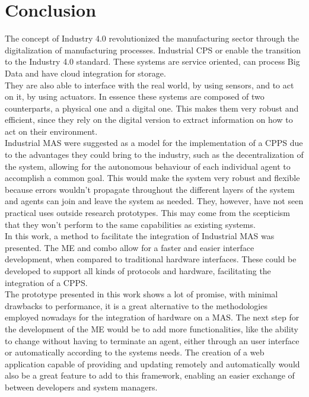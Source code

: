 


\glsresetall

\chapter{Conclusion}
\label{cha:conclusion}

The concept of Industry 4.0 revolutionized the manufacturing sector through the digitalization of manufacturing processes. Industrial \acrlong{CPS} or  enable the transition to the Industry 4.0 standard. These systems are service oriented, can process Big Data and have cloud integration for storage.\\

They are also able to interface with the real world, by using sensors, and to act on it, by using actuators. In essence these systems are composed of two counterparts, a physical one and a digital one. This makes them very robust and efficient, since they rely on the digital version to extract information on how to act on their environment.\\

Industrial \acrlong{MAS} were suggested as a model for the implementation of a \acrlong{CPPS} due to the advantages they could bring to the industry, such as the decentralization of the system, allowing for the autonomous behaviour of each individual agent to accomplish a common goal. This would make the system very robust and flexible because errors wouldn't propagate throughout the different layers of the system and agents can join and leave the system as needed. They, however, have not seen practical uses outside research prototypes. This may come from the scepticism that they won't perform to the same capabilities as existing systems.\\

In this work, a method to facilitate the integration of Industrial \acrlong{MAS} was presented. The \acrlong{ME} and  combo allow for a faster and easier interface development, when compared to traditional hardware interfaces. These  could be developed to support all kinds of protocols and hardware, facilitating the integration of a \acrlong{CPPS}.\\

The prototype presented in this work shows a lot of promise, with minimal drawbacks to performance, it is a great alternative to the methodologies employed nowadays for the integration of hardware on a \acrlong{MAS}. The next step for the development of the \acrlong{ME} would be to add more functionalities, like the ability to change  without having to terminate an agent, either through an user interface or automatically according to the systems needs. The creation of a web application capable of providing and updating  remotely and automatically would also be a great feature to add to this framework, enabling an easier exchange of  between developers and system managers.\\

